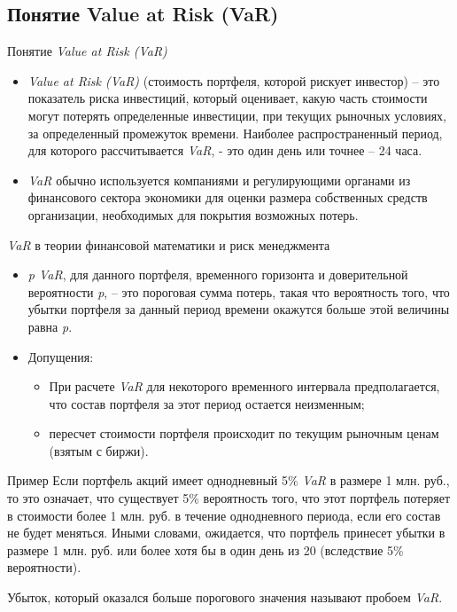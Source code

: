 \documentclass[_fin_decisions_lectures.tex]{subfiles}
\begin{document}
\subsection{Понятие Value at Risk (VaR)}
\begin{frame}[ allowframebreaks ]{Понятие \textit{Value at Risk (VaR)}}
\begin{itemize}
\item
\textit{Value at Risk (VaR)}  (стоимость портфеля, которой рискует инвестор) – это показатель риска инвестиций, который оценивает, какую часть стоимости могут потерять определенные инвестиции, при текущих рыночных условиях, за определенный промежуток времени. Наиболее распространенный период, для которого рассчитывается \textit{VaR}, - это один день или точнее – 24 часа. 
\item
\textit{VaR} обычно используется компаниями и регулирующими органами из финансового сектора экономики для оценки размера собственных средств организации, необходимых для покрытия возможных потерь.

\end{itemize}
\end{frame}

\begin{frame}[ allowframebreaks ]{\textit{VaR }в теории финансовой математики и риск менеджмента}
\begin{itemize}
\item
\textit{p VaR}, для данного портфеля, временного горизонта и доверительной вероятности \textit{p},  – это пороговая сумма потерь, такая что вероятность того, что убытки портфеля за данный период времени окажутся больше этой величины равна \textit{p}. 
\item
\pagebreak
Допущения:
\begin{itemize}
\item
При расчете \textit{VaR} для некоторого  временного интервала предполагается, что состав портфеля за этот период остается неизменным;
\item
пересчет стоимости портфеля происходит по текущим рыночным ценам (взятым с биржи).
\end{itemize}
\end{itemize}
\end{frame}

\begin{frame}
\begin{exampleblock}{Пример}
Если портфель акций имеет однодневный 5\% \textit{VaR }в размере 1 млн. руб., то это означает, что существует 5\% вероятность того, что этот портфель потеряет в стоимости более 1 млн. руб. в течение однодневного периода, если его состав не будет меняться. Иными словами, ожидается, что портфель принесет убытки в размере 1 млн. руб. или более хотя бы в один день из 20 (вследствие 5\% вероятности). \end{exampleblock}

Убыток, который оказался больше порогового значения называют пробоем \textit{VaR}.

\end{frame}
\end{document}
